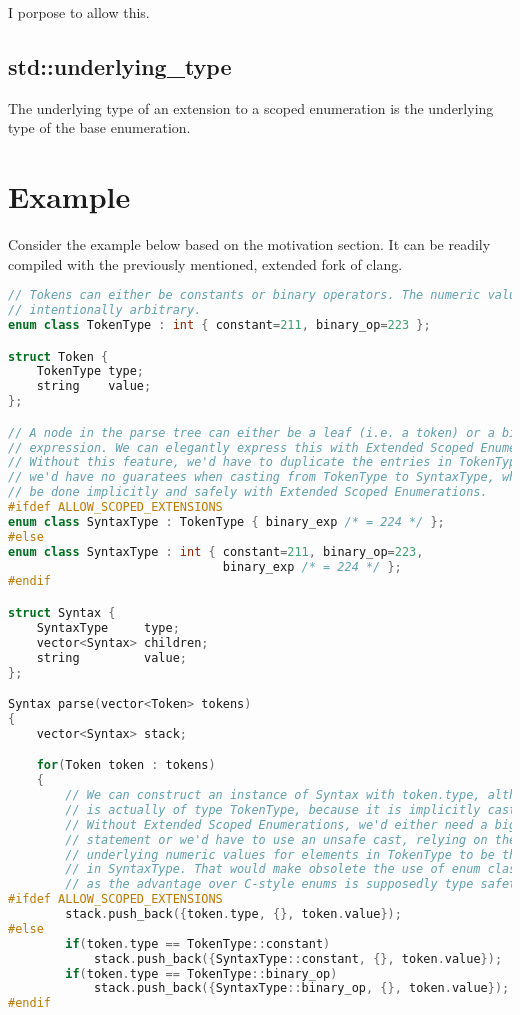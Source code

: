 \documentclass{scrartcl}
\begin{document}
I porpose to allow this.

\subsection*{std::underlying\_type}
The underlying type of an extension to a scoped enumeration is the underlying type of the base enumeration.

\newpage
\section*{Example}
Consider the example below based on the motivation section.
It can be readily compiled with the previously mentioned, extended fork of clang.

{\footnotesize
\begin{lstlisting}[language=C++]
// Tokens can either be constants or binary operators. The numeric values are
// intentionally arbitrary.
enum class TokenType : int { constant=211, binary_op=223 };

struct Token {
    TokenType type;
    string    value;
};

// A node in the parse tree can either be a leaf (i.e. a token) or a binary
// expression. We can elegantly express this with Extended Scoped Enumerations.
// Without this feature, we'd have to duplicate the entries in TokenType and
// we'd have no guaratees when casting from TokenType to SyntaxType, which can
// be done implicitly and safely with Extended Scoped Enumerations.
#ifdef ALLOW_SCOPED_EXTENSIONS
enum class SyntaxType : TokenType { binary_exp /* = 224 */ };
#else
enum class SyntaxType : int { constant=211, binary_op=223,
                              binary_exp /* = 224 */ };
#endif

struct Syntax {
    SyntaxType     type;
    vector<Syntax> children;
    string         value;
};

Syntax parse(vector<Token> tokens)
{
    vector<Syntax> stack;

    for(Token token : tokens)
    {
        // We can construct an instance of Syntax with token.type, although it
        // is actually of type TokenType, because it is implicitly cast.
        // Without Extended Scoped Enumerations, we'd either need a big switch
        // statement or we'd have to use an unsafe cast, relying on the
        // underlying numeric values for elements in TokenType to be the same as
        // in SyntaxType. That would make obsolete the use of enum class,
        // as the advantage over C-style enums is supposedly type safety.
#ifdef ALLOW_SCOPED_EXTENSIONS
        stack.push_back({token.type, {}, token.value});
#else
        if(token.type == TokenType::constant)
            stack.push_back({SyntaxType::constant, {}, token.value});
        if(token.type == TokenType::binary_op)
            stack.push_back({SyntaxType::binary_op, {}, token.value});
#endif


\end{lstlisting}}
\end{document}
